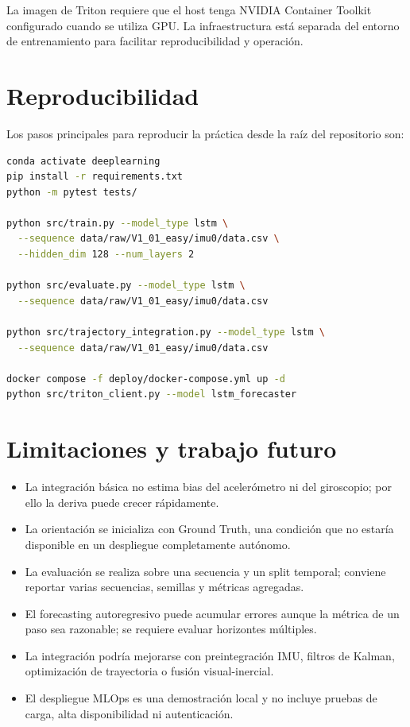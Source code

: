 \documentclass[11pt,a4paper]{article}
\begin{document}
La imagen de Triton requiere que el host tenga NVIDIA Container Toolkit
configurado cuando se utiliza GPU. La infraestructura est\'a separada del
entorno de entrenamiento para facilitar reproducibilidad y operaci\'on.

\section{Reproducibilidad}

Los pasos principales para reproducir la pr\'actica desde la ra\'iz del
repositorio son:

\begin{lstlisting}[language=bash,caption={Comandos principales del proyecto.}]
conda activate deeplearning
pip install -r requirements.txt
python -m pytest tests/

python src/train.py --model_type lstm \
  --sequence data/raw/V1_01_easy/imu0/data.csv \
  --hidden_dim 128 --num_layers 2

python src/evaluate.py --model_type lstm \
  --sequence data/raw/V1_01_easy/imu0/data.csv

python src/trajectory_integration.py --model_type lstm \
  --sequence data/raw/V1_01_easy/imu0/data.csv

docker compose -f deploy/docker-compose.yml up -d
python src/triton_client.py --model lstm_forecaster
\end{lstlisting}

\section{Limitaciones y trabajo futuro}

\begin{itemize}
  \item La integraci\'on b\'asica no estima bias del aceler\'ometro ni del
        giroscopio; por ello la deriva puede crecer r\'apidamente.
  \item La orientaci\'on se inicializa con Ground Truth, una condici\'on que
        no estar\'ia disponible en un despliegue completamente aut\'onomo.
  \item La evaluaci\'on se realiza sobre una secuencia y un split temporal;
        conviene reportar varias secuencias, semillas y m\'etricas agregadas.
  \item El forecasting autoregresivo puede acumular errores aunque la m\'etrica
        de un paso sea razonable; se requiere evaluar horizontes m\'ultiples.
  \item La integraci\'on podr\'ia mejorarse con preintegraci\'on IMU, filtros
        de Kalman, optimizaci\'on de trayectoria o fusi\'on visual-inercial.
  \item El despliegue MLOps es una demostraci\'on local y no incluye pruebas de
        carga, alta disponibilidad ni autenticaci\'on.
\end{itemize}
\end{document}
